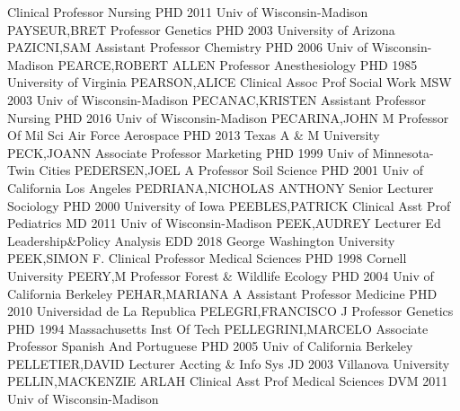 \documentclass[
]{article}
\begin{document}
\textbar Clinical Professor \textbar Nursing \textbar PHD 2011 Univ of
Wisconsin-Madison \textbar{}  \textbar PAYSEUR,BRET
\textbar Professor \textbar Genetics \textbar PHD 2003 University of
Arizona \textbar{}  \textbar PAZICNI,SAM \textbar Assistant
Professor \textbar Chemistry \textbar PHD 2006 Univ of Wisconsin-Madison
\textbar{}  \textbar PEARCE,ROBERT ALLEN \textbar Professor
\textbar Anesthesiology \textbar PHD 1985 University of Virginia
\textbar{}  \textbar PEARSON,ALICE \textbar Clinical Assoc
Prof \textbar Social Work \textbar MSW 2003 Univ of Wisconsin-Madison
\textbar{}  \textbar PECANAC,KRISTEN \textbar Assistant
Professor \textbar Nursing \textbar PHD 2016 Univ of Wisconsin-Madison
\textbar{}  \textbar PECARINA,JOHN M \textbar Professor Of
Mil Sci \textbar Air Force Aerospace \textbar PHD 2013 Texas A \& M
University \textbar{}  \textbar PECK,JOANN
\textbar Associate Professor \textbar Marketing \textbar PHD 1999 Univ
of Minnesota-Twin Cities \textbar{}  \textbar PEDERSEN,JOEL
A \textbar Professor \textbar Soil Science \textbar PHD 2001 Univ of
California Los Angeles \textbar{} 
\textbar PEDRIANA,NICHOLAS ANTHONY \textbar Senior Lecturer
\textbar Sociology \textbar PHD 2000 University of Iowa \textbar{}
 \textbar PEEBLES,PATRICK \textbar Clinical Asst Prof
\textbar Pediatrics \textbar MD 2011 Univ of Wisconsin-Madison
\textbar{}  \textbar PEEK,AUDREY \textbar Lecturer
\textbar Ed Leadership\&Policy Analysis \textbar EDD 2018 George
Washington University \textbar{}  \textbar PEEK,SIMON F.
\textbar Clinical Professor \textbar Medical Sciences \textbar PHD 1998
Cornell University \textbar{}  \textbar PEERY,M
\textbar Professor \textbar Forest \& Wildlife Ecology \textbar PHD 2004
Univ of California Berkeley \textbar{} 
\textbar PEHAR,MARIANA A \textbar Assistant Professor \textbar Medicine
\textbar PHD 2010 Universidad de La Republica \textbar{} 
\textbar PELEGRI,FRANCISCO J \textbar Professor \textbar Genetics
\textbar PHD 1994 Massachusetts Inst Of Tech \textbar{} 
\textbar PELLEGRINI,MARCELO \textbar Associate Professor
\textbar Spanish And Portuguese \textbar PHD 2005 Univ of California
Berkeley \textbar{}  \textbar PELLETIER,DAVID
\textbar Lecturer \textbar Accting \& Info Sys \textbar JD 2003
Villanova University \textbar{}  \textbar PELLIN,MACKENZIE
ARLAH \textbar Clinical Asst Prof \textbar Medical Sciences \textbar DVM
2011 Univ of Wisconsin-Madison \textbar{} 
\end{document}
